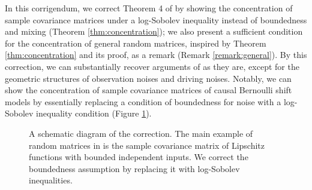 \documentclass[11pt,a4paper]{article}
\theoremstyle{remark}
\theoremstyle{definition}
\newcommand{\bX}{X}
\newcommand{\bzeta}{\zeta}
\theoremstyle{definition}
\begin{document}
\begin{bibunit}[apalike]
In this corrigendum, we correct Theorem 4 of \cite{nakakita2024dimension} by showing the concentration of sample covariance matrices under a log-Sobolev inequality instead of boundedness and mixing (Theorem \ref{thm:concentration}); we also present a sufficient condition for the concentration of general random matrices, inspired by Theorem \ref{thm:concentration} and its proof, as a remark (Remark \ref{remark:general}).
By this correction, we can substantially recover arguments of \citet{nakakita2024dimension} as they are, except for the geometric structures of observation noises and driving noises.
Notably, we can show the concentration of sample covariance matrices of causal Bernoulli shift models by essentially replacing a condition of boundedness for noise with a log-Sobolev inequality condition (Figure \ref{fig:diagram}). 


\begin{figure}
    \centering
    \caption{A schematic diagram of the correction. The main example of random matrices in \citet{nakakita2024dimension} is the sample covariance matrix of Lipschitz functions with bounded independent inputs.
    We correct the boundedness assumption by replacing it with log-Sobolev inequalities.}
    \label{fig:diagram}
\end{figure}


\end{bibunit}
\end{document}
